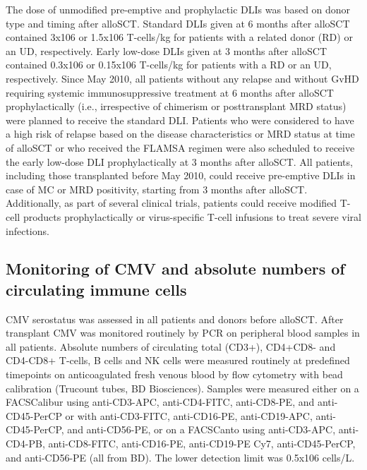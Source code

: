 \documentclass[
  letterpaper,
  DIV=11,
  numbers=noendperiod]{scrreprt}
\begin{document}
The dose of unmodified pre-emptive and prophylactic DLIs was based on
donor type and timing after alloSCT. Standard DLIs given at 6 months
after alloSCT contained 3x106 or 1.5x106 T-cells/kg for patients with a
related donor (RD) or an UD, respectively. Early low-dose DLIs given at
3 months after alloSCT contained 0.3x106 or 0.15x106 T-cells/kg for
patients with a RD or an UD, respectively. Since May 2010, all patients
without any relapse and without GvHD requiring systemic
immunosuppressive treatment at 6 months after alloSCT prophylactically
(i.e., irrespective of chimerism or posttransplant MRD status) were
planned to receive the standard DLI. Patients who were considered to
have a high risk of relapse based on the disease characteristics or MRD
status at time of alloSCT or who received the FLAMSA regimen were also
scheduled to receive the early low-dose DLI prophylactically at 3 months
after alloSCT. All patients, including those transplanted before May
2010, could receive pre-emptive DLIs in case of MC or MRD positivity,
starting from 3 months after alloSCT. Additionally, as part of several
clinical trials, patients could receive modified T-cell products
prophylactically or virus-specific T-cell infusions to treat severe
viral infections.

\hypertarget{monitoring-of-cmv-and-absolute-numbers-of-circulating-immune-cells}{%
\subsection{Monitoring of CMV and absolute numbers of circulating immune
cells}\label{monitoring-of-cmv-and-absolute-numbers-of-circulating-immune-cells}}

CMV serostatus was assessed in all patients and donors before alloSCT.
After transplant CMV was monitored routinely by PCR on peripheral blood
samples in all patients. Absolute numbers of circulating total (CD3+),
CD4+CD8- and CD4-CD8+ T-cells, B cells and NK cells were measured
routinely at predefined timepoints on anticoagulated fresh venous blood
by flow cytometry with bead calibration (Trucount tubes, BD
Biosciences). Samples were measured either on a FACSCalibur using
anti-CD3-APC, anti-CD4-FITC, anti-CD8-PE, and anti-CD45-PerCP or with
anti-CD3-FITC, anti-CD16-PE, anti-CD19-APC, anti-CD45-PerCP, and
anti-CD56-PE, or on a FACSCanto using anti-CD3-APC, anti-CD4-PB,
anti-CD8-FITC, anti-CD16-PE, anti-CD19-PE Cy7, anti-CD45-PerCP, and
anti-CD56-PE (all from BD). The lower detection limit was 0.5x106
cells/L.
\end{document}
